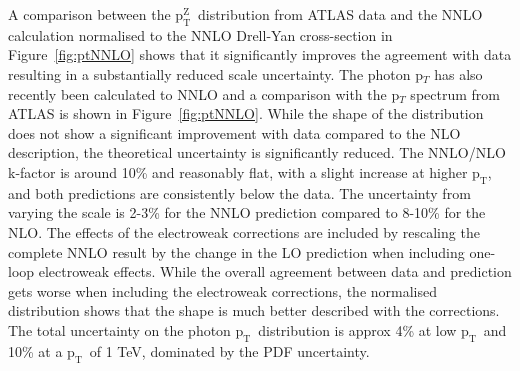 \documentclass[a4paper,11pt,notoc]{article}
\newcommand{\pt}{\ensuremath{\mathrm{p_T}}}
\newcommand{\ptZ}{\ensuremath{\mathrm{p_T^{Z}}}}
\begin{document}
A comparison between the \ptZ\ distribution from ATLAS data and the NNLO calculation normalised to the NNLO Drell-Yan cross-section in Figure~\ref{fig:ptNNLO} shows that it significantly improves the agreement with data resulting in a substantially reduced scale uncertainty. The photon p$_T$ has also recently been calculated to NNLO and a comparison with the p$_{T}$ spectrum from ATLAS is shown in Figure~\ref{fig:ptNNLO}. While the shape of the distribution does not show a significant improvement with data compared to the NLO description, the theoretical uncertainty is significantly reduced. The NNLO/NLO k-factor is around 10\% and reasonably flat, with a slight increase at higher \pt, and both predictions are consistently below the data. The uncertainty from varying the scale is 2-3\% for the NNLO prediction compared to 8-10\% for the NLO. The effects of the electroweak corrections are included by rescaling the complete NNLO result by the change in the LO prediction when including one-loop electroweak effects. While the overall agreement between data and prediction gets worse when including the electroweak corrections, the normalised distribution shows that the shape is much better described with the corrections. The total uncertainty on the photon \pt\ distribution is approx 4\% at low \pt\ and 10\% at a \pt\ of 1 TeV, dominated by the PDF uncertainty.

\end{document}
